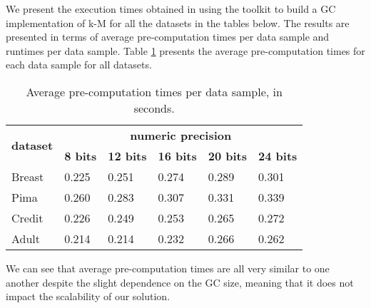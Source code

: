 We present the execution times obtained in using the toolkit to build a \ac{GC} implementation of \ac{k-M} for all the datasets in the tables below. The results are presented in terms of average pre-computation times per data sample and runtimes per data sample. Table \ref{table:avgKMAllDatasets} presents the average pre-computation times for each data sample for all datasets.

\begin{table}[H]
\centering
\caption{Average pre-computation times per data sample, in seconds.}
\label{table:avgKMAllDatasets}
\begin{tabular}{|l|l|l|l|l|l|}
\hline
\multirow{2}{*}{\textbf{dataset}} & \multicolumn{5}{c|}{\textbf{numeric precision}}                                             \\ \cline{2-6} 
                                  & \textbf{8 bits} & \textbf{12 bits} & \textbf{16 bits} & \textbf{20 bits} & \textbf{24 bits} \\ \hline
Breast                            & 0.225           & 0.251            & 0.274            & 0.289            & 0.301            \\ \hline
Pima                              & 0.260           & 0.283            & 0.307            & 0.331            & 0.339            \\ \hline
Credit                            & 0.226           & 0.249            & 0.253            & 0.265            & 0.272            \\ \hline
Adult                             & 0.214           & 0.214            & 0.232            & 0.266            & 0.262            \\ \hline
\end{tabular}
\end{table}

We can see that average pre-computation times are all very similar to one another despite the slight dependence on the \ac{GC} size, meaning that it does not impact the scalability of our solution.


